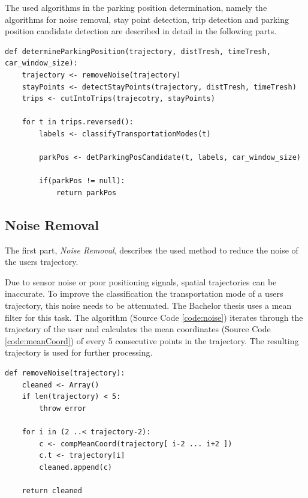The used algorithms in the parking position determination, namely the algorithms for noise removal, stay point detection, trip detection and parking position candidate detection are described in detail in the following parts.


\begin{lstlisting}[style=py, caption={Pseudocode: Determine Parking Position Candidate}, label={code:DetParkPos}]
def determineParkingPosition(trajectory, distTresh, timeTresh, car_window_size):
    trajectory <- removeNoise(trajectory)
    stayPoints <- detectStayPoints(trajectory, distTresh, timeTresh)
    trips <- cutIntoTrips(trajecotry, stayPoints)
    
    for t in trips.reversed():
        labels <- classifyTransportationModes(t)
        
        parkPos <- detParkingPosCandidate(t, labels, car_window_size)
        
        if(parkPos != null):
            return parkPos
\end{lstlisting}



\subsection{Noise Removal}
The first part, \textit{Noise Removal}, describes the used method to reduce the noise of the users trajectory.

Due to sensor noise or poor positioning signals, spatial trajectories can be inaccurate. To improve the classification the transportation mode of a users trajectory, this noise needs to be attenuated. The Bachelor thesis uses a mean filter for this task. The algorithm (Source Code \ref{code:noise}) iterates through the trajectory of the user and calculates the mean coordinates (Source Code \ref{code:meanCoord}) of every 5 consecutive points in the trajectory. The resulting trajectory is used for further processing. \cite{Zheng:2015:TDM:2764959.2743025}


\begin{lstlisting}[style=py, caption={Pseudocode: Noise Removal \cite{Zheng:2015:TDM:2764959.2743025}}, label={code:noise}]
def removeNoise(trajectory):
    cleaned <- Array()
    if len(trajectory) < 5:
        throw error
    
    for i in (2 ..< trajectory-2):
        c <- compMeanCoord(trajectory[ i-2 ... i+2 ])
        c.t <- trajectory[i]
        cleaned.append(c)
    
    return cleaned
\end{lstlisting}

